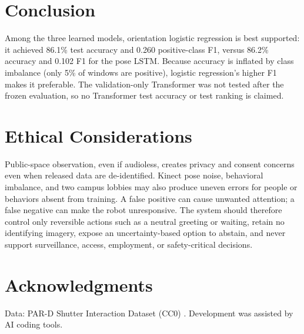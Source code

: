 \documentclass[final]{article}
\begin{document}
\section*{Conclusion}

Among the three learned models, orientation logistic regression is best supported: it achieved 86.1\% test accuracy and 0.260 positive-class F1, versus 86.2\% accuracy and 0.102 F1 for the pose LSTM. Because accuracy is inflated by class imbalance (only 5\% of windows are positive), logistic regression's higher F1 makes it preferable. The validation-only Transformer was not tested after the frozen evaluation, so no Transformer test accuracy or test ranking is claimed.

\section*{Ethical Considerations}

Public-space observation, even if audioless, creates privacy and consent concerns even when released data are de-identified. Kinect pose noise, behavioral imbalance, and two campus lobbies may also produce uneven errors for people or behaviors absent from training. A false positive can cause unwanted attention; a false negative can make the robot unresponsive. The system should therefore control only reversible actions such as a neutral greeting or waiting, retain no identifying imagery, expose an uncertainty-based option to abstain, and never support surveillance, access, employment, or safety-critical decisions.

\clearpage



\section*{Acknowledgments}
Data: PAR-D Shutter Interaction Dataset (CC0) \citep{thompson2024pard}. Development was assisted by AI coding tools.
\end{document}
